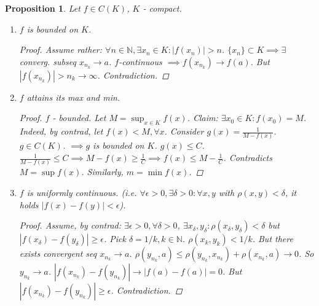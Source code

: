 \documentclass[12pt]{article}
\theoremstyle{blueplain}
\newtheorem{proposition}[theorem]{Proposition}
\theoremstyle{bluedef}
\theoremstyle{blueremark}
\newcommand{\N}{\mathbb{N}}
\numberwithin{equation}{section}
\begin{document}
      \begin{proposition}
        Let $f \in C(K)$, $K$ - compact.
        \begin{enumerate}
          \item $f$ is bounded on $K$.
                \begin{proof}
                  Assume rather: $\forall n \in \N, \exists x_n \in K: |f(x_n)| > n$.
                  $\{x_n\} \subset K \implies \exists$ converg. subseq $x_{n_k} \to a$.
                  $f$-continuous $\implies f(x_{n_k}) \to f(a)$.
                  But $|f(x_{n_k})| > n_k \to \infty$. Contradiction.
                \end{proof}
          \item $f$ attains its max and min.
                \begin{proof}
                  $f$ - bounded. Let $M = \sup_{x \in K} f(x)$.
                  Claim: $\exists x_0 \in K: f(x_0) = M$.
                  Indeed, by contrad, let $f(x) < M, \forall x$.
                  Consider $g(x) = \frac{1}{M - f(x)}$. $g \in C(K)$.
                  $\implies g$ is bounded on $K$. $g(x) \leq C$.
                  $\frac{1}{M - f(x)} \leq C \implies M - f(x) \geq \frac{1}{C} \implies f(x) \leq M - \frac{1}{C}$.
                  Contradicts $M = \sup f(x)$.
                  Similarly, $m = \min f(x)$.
                \end{proof}
          \item $f$ is uniformly continuous.
                (i.e. $\forall \epsilon > 0, \exists \delta > 0: \forall x, y$ with $\rho(x, y) < \delta$, it holds $|f(x) - f(y)| < \epsilon$).
                \begin{proof}
                  Assume, by contrad: $\exists \epsilon > 0, \forall \delta > 0$,
                  $\exists x_\delta, y_\delta: \rho(x_\delta, y_\delta) < \delta$ but $|f(x_\delta) - f(y_\delta)| \geq \epsilon$.
                  Pick $\delta = 1/k, k \in \N$.
                  $\rho(x_k, y_k) < 1/k$.
                  But there exists convergent seq $x_{n_k} \to a$.
                  $\rho(y_{n_k}, a) \leq \rho(y_{n_k}, x_{n_k}) + \rho(x_{n_k}, a) \to 0$.
                  So $y_{n_k} \to a$.
                  $|f(x_{n_k}) - f(y_{n_k})| \to |f(a) - f(a)| = 0$.
                  But $|f(x_{n_k}) - f(y_{n_k})| \geq \epsilon$. Contradiction.
                \end{proof}
        \end{enumerate}
      \end{proposition}
\end{document}
